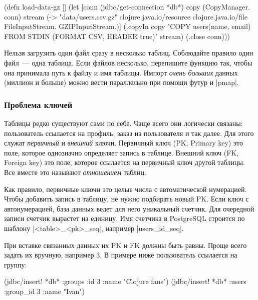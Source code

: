\begin{english}
  \begin{clojure}
(defn load-data-gz []
  (let [conn (jdbc/get-connection *db*)
        copy (CopyManager. conn)
        stream (-> "data/users.csv.gz"
                   clojure.java.io/resource
                   clojure.java.io/file
                   FileInputStream.
                   GZIPInputStream.)]
    (.copyIn copy "COPY users(name, email)
                   FROM STDIN (FORMAT CSV, HEADER true)"
             stream)
    (.close conn)))
  \end{clojure}
\end{english}

Нельзя загрузить один файл сразу в несколько таблиц. Соблюдайте правило один
файл~--- одна таблица. Если файлов несколько, перепишите функцию так, чтобы она
принимала путь к файлу и имя таблицы. Импорт \emph{очень больших} данных
(миллион и больше) можно вести параллельно при помощи футур и \spverb|pmap|.

\subsubsection*{Проблема ключей}

Таблицы редко существуют сами по себе. Чаще всего они логически связаны:
пользователь ссылается на профиль, заказ на пользователя и так далее. Для этого
служат \emph{первичный} и \emph{внешний} ключи. Первичный ключ (PK, Primary key)
это поле, которое однозначно определяет запись в таблице. Внешний ключ (FK,
Foreign key) это поле, которое ссылается на первичный ключ другой таблицы. Все
вместе это называют \emph{отношением} таблиц.

Как правило, первичные ключи это целые числа с автоматической нумерацией. Чтобы
добавить запись в таблицу, не нужно подбирать новый PK. Если ключ с
автонумерацией, база данных ведет для него уникальный счетчик. Для очередной
записи счетчик вырастет на единицу. Имя счетчика в PostgreSQL строится по
шаблону \spverb|<table>_<pk>_seq|, например \spverb|users_id_seq|.

При вставке связанных данных их PK и FK должны быть равны. Проще всего задать их
вручную, например 3. В примере ниже пользователь ссылается на группу:

\begin{english}
  \begin{clojure}
(jdbc/insert! *db* :groups {:id 3 :name "Clojure fans"})
(jdbc/insert! *db* :users {:group_id 3 :name "Ivan"})
  \end{clojure}
\end{english}

